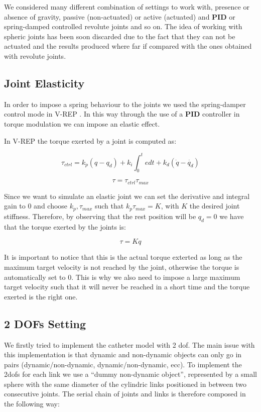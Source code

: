 \documentclass[conference,12pt]{IEEEtran}
\begin{document}
We considered many different combination of settings to work with, presence or absence of gravity, passive (non-actuated) or active (actuated) and \textbf{PID} or spring-damped controlled revolute joints and so on. The idea of working with spheric joints has been soon discarded due to the fact that they can not be actuated and the results produced where far if compared with the ones obtained with revolute joints.

\subsection{Joint Elasticity}

In order to impose a spring behaviour to the joints we used the spring-damper control mode in V-REP \cite{spring}. In this way through the use of a \textbf{PID} controller in torque modulation we can impose an elastic effect.

In V-REP the torque exerted by a joint is computed as:

\[\tau_{ctrl} = k_p(q-q_d) + k_i \int_0^t{edt} + k_d(\dot{q} - \dot{q_d})\]

\[\tau = \tau_{ctrl}\tau_{max}\]

Since we want to simulate an elastic joint we can set the derivative and integral gain to 0 and choose $k_p,\tau_{max}$ such that $k_p\tau_{max} = K$, with $K$ the desired joint stiffness. Therefore, by observing that the rest position will be $q_d = 0$ we have that the torque exerted by the joints is:

\[\tau = Kq\]

It is important to notice that this is the actual torque exterted as long as the maximum target velocity is not reached by the joint, otherwise the torque is automatically set to 0. This is why we also need to impose a large maximum target velocity such that it will never be reached in a short time and the torque exerted is the right one.

\subsection{2 DOFs Setting}

We firstly tried to implement the catheter model with 2 dof. The main issue with this implementation is that dynamic and non-dynamic objects can only go in pairs (dynamic/non-dynamic, dynamic/non-dynamic, ecc). To implement the 2dofs for each link we use a “dummy non-dynamic object”, represented by a small sphere with the same diameter of the cylindric links positioned in between two consecutive joints. The serial chain of joints and links is therefore composed in the following way:
\end{document}
